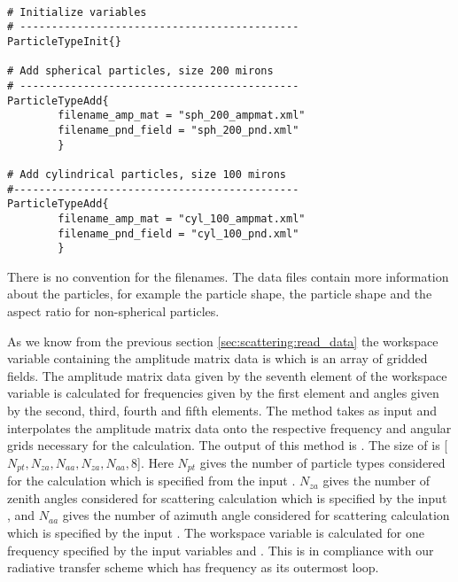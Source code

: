 \begin{verbatim}

# Initialize variables
# --------------------------------------------
ParticleTypeInit{}

# Add spherical particles, size 200 mirons
# --------------------------------------------
ParticleTypeAdd{
        filename_amp_mat = "sph_200_ampmat.xml" 
        filename_pnd_field = "sph_200_pnd.xml"
        }       

# Add cylindrical particles, size 100 mirons
#---------------------------------------------
ParticleTypeAdd{
        filename_amp_mat = "cyl_100_ampmat.xml" 
        filename_pnd_field = "cyl_100_pnd.xml"
        }   

\end{verbatim}
 
There is no convention for the filenames. The data files contain more 
information about the particles, for example the particle shape, the
particle shape and the aspect ratio for non-spherical particles.



\label{sec:scattering:gen_ampmat}

As we know from the previous section \ref{sec:scattering:read_data} 
the workspace variable containing the amplitude matrix data is 
 which is an array of gridded
fields. The amplitude matrix data given by the seventh element of the
workspace variable  is calculated for
frequencies given by the first element  and angles given by the
second, third,  fourth and fifth elements.  The method
 takes  as input and
interpolates the amplitude matrix data onto the respective frequency
and angular grids necessary for the calculation.  The output of this
method is .  The size of  is  
[$N_{pt}, N_{za}, N_{aa}, N_{za}, N_{aa}, 8$]. Here $N_{pt}$ gives
the number of particle types considered for the calculation which is
specified from the input . $N_{za}$ gives
the number of zenith angles considered for scattering calculation 
which is specified by the input , and $N_{aa}$
gives the number of azimuth angle considered for scattering
calculation which is specified by the input .
The workspace variable  is calculated for one
frequency specified by the input variables  and
. This is in compliance with our radiative
transfer scheme which has frequency as its outermost loop. 

